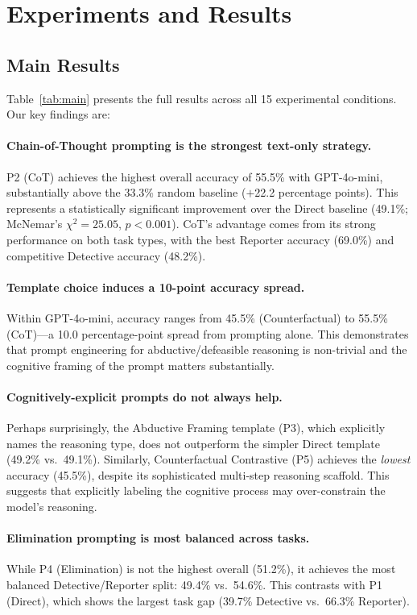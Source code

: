 \section{Experiments and Results}
\label{sec:experiments}

\subsection{Main Results}

Table~\ref{tab:main} presents the full results across all 15 experimental conditions.
Our key findings are:

\paragraph{Chain-of-Thought prompting is the strongest text-only strategy.}
P2 (CoT) achieves the highest overall accuracy of 55.5\% with GPT-4o-mini, substantially above the 33.3\% random baseline ($+$22.2 percentage points).
This represents a statistically significant improvement over the Direct baseline (49.1\%; McNemar's $\chi^2=25.05$, $p<0.001$).
CoT's advantage comes from its strong performance on both task types, with the best Reporter accuracy (69.0\%) and competitive Detective accuracy (48.2\%).

\paragraph{Template choice induces a 10-point accuracy spread.}
Within GPT-4o-mini, accuracy ranges from 45.5\% (Counterfactual) to 55.5\% (CoT)---a 10.0 percentage-point spread from prompting alone.
This demonstrates that prompt engineering for abductive/defeasible reasoning is non-trivial and the cognitive framing of the prompt matters substantially.

\paragraph{Cognitively-explicit prompts do not always help.}
Perhaps surprisingly, the Abductive Framing template (P3), which explicitly names the reasoning type, does not outperform the simpler Direct template (49.2\% vs.\ 49.1\%).
Similarly, Counterfactual Contrastive (P5) achieves the \emph{lowest} accuracy (45.5\%), despite its sophisticated multi-step reasoning scaffold.
This suggests that explicitly labeling the cognitive process may over-constrain the model's reasoning.

\paragraph{Elimination prompting is most balanced across tasks.}
While P4 (Elimination) is not the highest overall (51.2\%), it achieves the most balanced Detective/Reporter split: 49.4\% vs.\ 54.6\%.
This contrasts with P1 (Direct), which shows the largest task gap (39.7\% Detective vs.\ 66.3\% Reporter).

